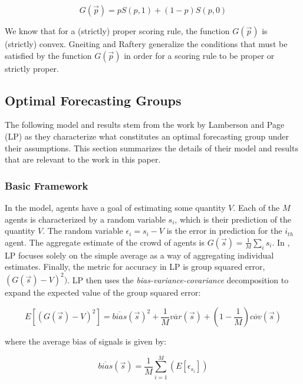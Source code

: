 \documentclass[twoside,twocolumn]{article}
\begin{document}
\begin{equation}
\label{gfunction}
G(\vec{p}) = pS(p,1) + (1-p)S(p,0)
\end{equation}

We know that for a (strictly) proper scoring rule, the function $G(\vec{p})$ is (strictly) convex. Gneiting and Raftery \cite{4} generalize the conditions that must be satisfied by the function $G(\vec{p})$ in order for a scoring rule to be proper or strictly proper.

\subsection{Optimal Forecasting Groups}

The following model and results stem from the work by Lamberson and Page (LP) \cite{3} as they characterize what constitutes an optimal forecasting group under their assumptions. This section summarizes the details of their model and results that are relevant to the work in this paper.\\
\subsubsection{Basic Framework}
In the model, agents have a goal of estimating some quantity $V$. Each of the $M$ agents is characterized by a random variable $s_i$, which is their prediction of the quantity $V$. The random variable $\epsilon_i = s_i - V$ is the error in prediction for the $i_{th}$ agent. The aggregate estimate of the crowd of agents is $G(\vec{s}) = \frac1M \sum_i s_i$. In \cite{3}, LP focuses solely on the simple average as a way of aggregating individual estimates. Finally, the metric for accuracy in LP is group squared error, $(G(\vec{s}) - V)^2)$. LP then uses the \textit{bias-variance-covariance} decomposition to expand the expected value of the group squared error:

\begin{equation}
\label{bvcdecomp}
E[(G(\vec{s}) - V)^2] = \overline{bias}(\vec{s})^2 + \frac1M\overline{var}(\vec{s}) + (1 - \frac1M)\overline{cov}(\vec{s})
\end{equation}

where the average bias of signals is given by:

\begin{equation}
\label{bias}
\overline{bias}(\vec{s}) = \frac1M \sum_{i = 1}^M (E[\epsilon_{s_i}])
\end{equation}
\end{document}

